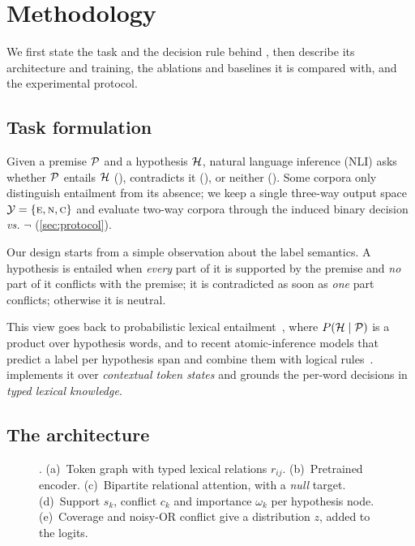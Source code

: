\section{Methodology}
\label{sec:method}

We first state the task and the decision rule behind \model{}, then describe its architecture and
training, the ablations and baselines it is compared with, and the experimental protocol.

\subsection{Task formulation}
\label{sec:task}

Given a premise $\mathcal{P}$ and a hypothesis $\mathcal{H}$, natural language inference (NLI) asks whether $\mathcal{P}$
entails $\mathcal{H}$ (\E), contradicts it (\C), or neither (\N). Some corpora only distinguish entailment from
its absence; we keep a single three-way output space $\mathcal{Y}=\{\textsc{e},\textsc{n},\textsc{c}\}$ and evaluate two-way
corpora through the induced binary decision \E{} \emph{vs.} $\neg$\E{} (\cref{sec:protocol}).

Our design starts from a simple observation about the label semantics. A hypothesis is entailed when
\emph{every} part of it is supported by the premise and \emph{no} part of it conflicts with the premise;
it is contradicted as soon as \emph{one} part conflicts; otherwise it is neutral.

This view goes back to
probabilistic lexical entailment~\citep{glickman2005probabilistic}, where $P(\mathcal{H}\mid\mathcal{P})$ is a
product over hypothesis words, and to recent atomic-inference models that predict a label per
hypothesis span and combine them with logical rules~\citep{stacey2022logical,wu2023weakly}.
\model{} implements it over \emph{contextual token states} and grounds the per-word decisions in
\emph{typed lexical knowledge}.

\subsection{The \model{} architecture}
\label{sec:architecture}

\begin{figure}[t]
  \centering
  
  \caption{\model{}. (a)~Token graph with typed lexical relations $r_{ij}$. (b)~Pretrained encoder.
  (c)~Bipartite relational attention, with a \emph{null} target. (d)~Support $s_k$, conflict $c_k$ and
  importance $\omega_k$ per hypothesis node. (e)~Coverage and noisy-OR conflict give a distribution $z$,
  added to the \cls{} logits.}
  \label{fig:architecture}
\end{figure}

